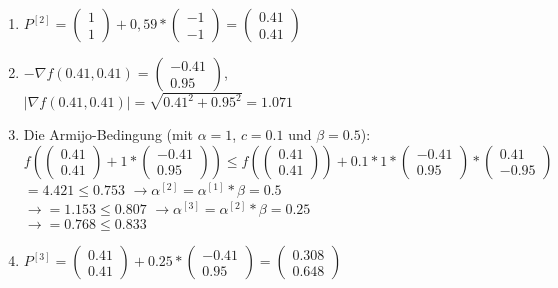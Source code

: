\documentclass[a4paper, 11pt]{article}
\begin{document}
\begin{enumerate}
    \item
    $P^{[2]} = \left( \begin{array}{c} 1 \\ 1 \end{array} \right) + 0,59 * \left( \begin{array}{c} -1 \\ -1 \end{array} \right) = \left( \begin{array}{c} 0.41 \\ 0.41 \end{array} \right)$
    \item
    $-{\nabla}f(0.41,0.41) = \left( \begin{array}{c} -0.41 \\ 0.95 \end{array} \right)$, \\
	$|{\nabla}f(0.41,0.41)| = \sqrt{0.41^2+0.95^2} = 1.071$
	\item    
	Die Armijo-Bedingung (mit $\alpha = 1$, $c = 0.1$ und $\beta = 0.5$):\\
	$f( \left( \begin{array}{c} 0.41 \\ 0.41 \end{array} \right) + 1 * \left( \begin{array}{c} -0.41 \\ 0.95 \end{array} \right)) \leq f(\left( \begin{array}{c} 0.41 \\ 0.41 \end{array} \right)) + 0.1 * 1 *  \left( \begin{array}{c} -0.41 \\ 0.95 \end{array} \right) * \left( \begin{array}{c} 0.41 \\ -0.95 \end{array} \right)$ \\
	$= 4.421 \leq 0.753$
	$\rightarrow \alpha^{[2]} = \alpha^{[1]} * \beta = 0.5$ \\
	$\rightarrow = 1.153 \leq 0.807$
	$\rightarrow \alpha^{[3]} = \alpha^{[2]} * \beta = 0.25$ \\
	$\rightarrow = 0.768 \leq 0.833$
	\item
	$P^{[3]} = \left( \begin{array}{c} 0.41 \\ 0.41 \end{array} \right) + 0.25 * \left( \begin{array}{c} -0.41 \\ 0.95 \end{array} \right) = \left( \begin{array}{c} 0.308 \\ 0.648 \end{array} \right)$

\end{enumerate}
\end{document}
